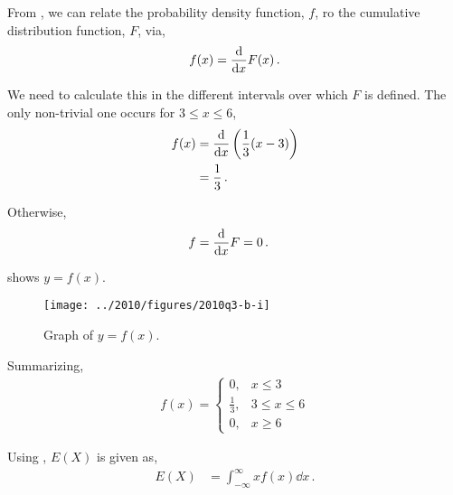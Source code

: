 \begin{subquestions}
	
\subquestion

\begin{subsubquestions}
	
\subsubquestion

From , we can relate the probability density function, $f$, ro the cumulative distribution function, $F$, via,
\begin{equation}
	f(x) = \frac{\mathrm{d}}{\mathrm{d}x}F(x) \,.
\end{equation}

We need to calculate this in the different intervals over which $F$ is defined. The only non-trivial one occurs for $3\leq x \leq 6$,
\begin{align}
	f(x) & = \frac{\mathrm{d}}{\mathrm{d}x}\left(\frac{1}{3}(x-3) \right) \nonumber \\
	     & = \frac{1}{3} \,.
\end{align}

Otherwise,
\begin{align}
	f &= \frac{\mathrm{d}}{\mathrm{d}x} F = 0\,.
\end{align}

 shows $y=f(x)$.
\begin{figure}[H]
	\begin{center}
		\texttt{[image: ../2010/figures/2010q3-b-i]}
		\caption{\label{2010:q3:fig:fGraph} Graph of $y=f(x)$.}
	\end{center}
\end{figure}

Summarizing,
\begin{align}
	f(x) =\begin{cases} 
	0, & x \leq 3 \\
	\frac{1}{3}, & 3 \leq x \leq 6 \\
	0, & x \geq 6 
		\end{cases}
\end{align}


\subsubquestion

Using , $E(X)$ is given as,
\begin{align}
	E(X) & = \int_{-\infty}^{\infty}x f(x)\dd x \,.
\end{align}


\end{subsubquestions}
\end{subquestions}

